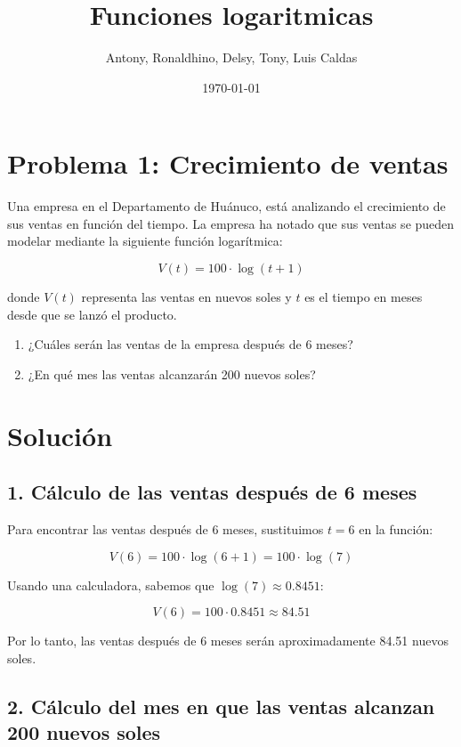 \documentclass{article}
\begin{document}
\title{Funciones logaritmicas}
\author{Antony, Ronaldhino, Delsy, Tony, Luis Caldas}
\date{\today}
\maketitle
\section*{Problema 1: Crecimiento de ventas}

Una empresa en el Departamento de Huánuco, está analizando el crecimiento de sus ventas en función del tiempo. La empresa ha notado que sus ventas se pueden modelar mediante la siguiente función logarítmica:

\[
V(t) = 100 \cdot \log(t + 1)
\]

donde \(V(t)\) representa las ventas en nuevos soles y \(t\) es el tiempo en meses desde que se lanzó el producto.


\begin{enumerate}
    \item ¿Cuáles serán las ventas de la empresa después de 6 meses?
    \item ¿En qué mes las ventas alcanzarán 200 nuevos soles?
\end{enumerate}

\section*{Solución}

\subsection*{1. Cálculo de las ventas después de 6 meses}

Para encontrar las ventas después de 6 meses, sustituimos \(t = 6\) en la función:

\[
V(6) = 100 \cdot \log(6 + 1) = 100 \cdot \log(7)
\]

Usando una calculadora, sabemos que \(\log(7) \approx 0.8451\):

\[
V(6) = 100 \cdot 0.8451 \approx 84.51
\]

Por lo tanto, las ventas después de 6 meses serán aproximadamente 84.51 nuevos soles.

\subsection*{2. Cálculo del mes en que las ventas alcanzan 200 nuevos soles}
\end{document}
